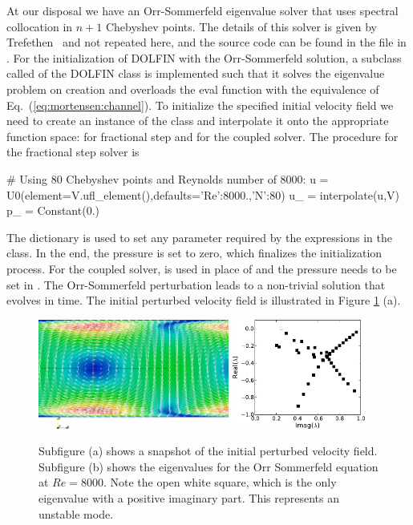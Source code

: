 At our disposal we have an Orr-Sommerfeld eigenvalue solver that uses spectral collocation in $n+1$ Chebyshev points. The details of this solver is given by Trefethen~\cite{Trefethen2006} and not repeated here, and the source code can be found in the file  in \cite{folder}. For the initialization of DOLFIN  with the Orr-Sommerfeld solution, a subclass called  of the DOLFIN class  is implemented such that it solves the eigenvalue problem on creation and overloads the eval function with the equivalence of Eq.~(\eqref{eq:mortensen:channel}). To initialize the specified initial velocity field we need to create an instance of the  class and interpolate it onto the appropriate function space:  for fractional step and  for the coupled solver. The procedure for the fractional step solver is
\begin{python}
    # Using 80 Chebyshev points and Reynolds number of 8000:
    u = U0(element=V.ufl_element(),defaults={'Re':8000.,'N':80}) 
    u_ = interpolate(u,V)
    p_ = Constant(0.)
\end{python}
The  dictionary is used to set any parameter required by the 
expressions in the  class. In the end, the pressure is set to zero, which finalizes the initialization process. For the coupled solver,  is used in place of  and the pressure needs to be set in . The Orr-Sommerfeld perturbation leads to a non-trivial solution that evolves in time. The initial perturbed velocity field is illustrated in Figure \ref{fig:mortensen:OS_init} (a).
\begin{figure}
 \includegraphics[width=0.56\textwidth]{chapters/mortensen/pdf/OS_init.pdf}
  \includegraphics[width=0.39\textwidth]{chapters/mortensen/pdf/OrrS_eigvals.pdf}
 \caption{Subfigure (a) shows a snapshot of the initial perturbed velocity field. Subfigure (b) shows the eigenvalues for the Orr Sommerfeld equation at $Re=8000$. Note the open white square, which is the only eigenvalue with a positive imaginary part. This represents an unstable mode.}
 \label{fig:mortensen:OS_init}
\end{figure}

